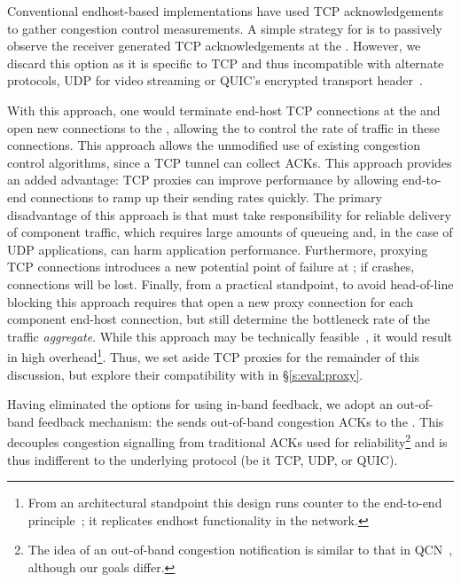 
Conventional endhost-based implementations have used TCP acknowledgements to gather congestion control measurements. A simple strategy for \name is to passively observe the receiver generated TCP acknowledgements at the \inbox. However, we discard this option as it is specific to TCP and thus incompatible with alternate protocols, \ie UDP for video streaming or QUIC's encrypted transport header~\cite{quic}.

 With this approach, one would terminate end-host TCP connections at the \inbox and open new connections to the \outbox, allowing the \inbox to control the rate of traffic in these connections.
This approach allows the unmodified use of existing congestion control algorithms, since a TCP tunnel can collect ACKs. This approach provides an added advantage: TCP proxies can improve performance by allowing end-to-end connections to ramp up their sending rates quickly. 
The primary disadvantage of this approach is that \name must take responsibility for reliable delivery of component traffic, which requires large amounts of queueing and, in the case of UDP applications, can harm application performance. 
Furthermore, proxying TCP connections introduces a new potential point of failure at \name; if \name crashes, connections will be lost.
Finally, from a practical standpoint, to avoid head-of-line blocking this approach requires that \name open a new proxy connection for each component end-host connection, but still determine the bottleneck rate of the traffic \emph{aggregate}. While this approach may be technically feasible~\cite{cm}, it would result in high 
overhead\footnote{From an architectural standpoint this design runs counter to the end-to-end principle~\cite{e2e-principle}; it replicates endhost functionality in the network.}.
Thus, we set aside TCP proxies for the remainder of this discussion, but explore their compatibility with \name in \S\ref{s:eval:proxy}. 

 Having eliminated the options for using in-band feedback, we adopt an out-of-band feedback mechanism: the \outbox sends out-of-band congestion ACKs to the \inbox.
This decouples congestion signalling from traditional ACKs used for reliability\footnote{The idea of an out-of-band congestion notification is similar to that in QCN~\cite{qcn}, although our goals differ.} and is thus indifferent to the underlying protocol (be it TCP, UDP, or QUIC).

